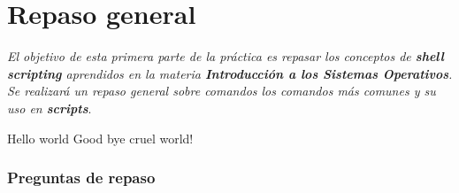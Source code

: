 \section{Repaso general}

\textit{El objetivo de esta primera parte de la práctica es repasar los
  conceptos de \textbf{shell scripting} aprendidos en la materia
  \textbf{Introducción a los Sistemas Operativos}. Se realizará un repaso
  general sobre comandos los comandos más comunes y su uso en
  \textbf{scripts}}.

\begin{questions}
\question Hello world
\question Good bye cruel world!
\end{questions}

\subsubsection{Preguntas de repaso}

